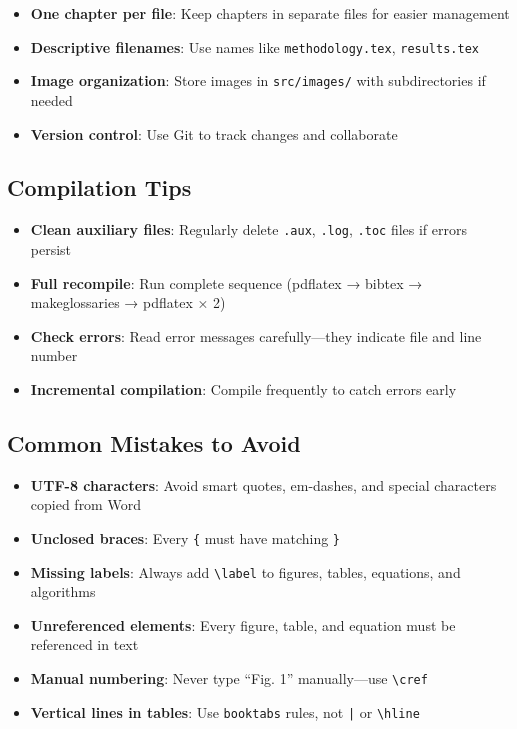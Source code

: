 \begin{itemize}
    \item \textbf{One chapter per file}: Keep chapters in separate files for easier management
    \item \textbf{Descriptive filenames}: Use names like \texttt{methodology.tex}, \texttt{results.tex}
    \item \textbf{Image organization}: Store images in \texttt{src/images/} with subdirectories if needed
    \item \textbf{Version control}: Use Git to track changes and collaborate
\end{itemize}

\subsection*{Compilation Tips}

\begin{itemize}
    \item \textbf{Clean auxiliary files}: Regularly delete \texttt{.aux}, \texttt{.log}, \texttt{.toc} files if errors persist
    \item \textbf{Full recompile}: Run complete sequence (pdflatex → bibtex → makeglossaries → pdflatex × 2)
    \item \textbf{Check errors}: Read error messages carefully---they indicate file and line number
    \item \textbf{Incremental compilation}: Compile frequently to catch errors early
\end{itemize}

\subsection*{Common Mistakes to Avoid}

\begin{itemize}
    \item \textbf{UTF-8 characters}: Avoid smart quotes, em-dashes, and special characters copied from Word
    \item \textbf{Unclosed braces}: Every \texttt{\{} must have matching \texttt{\}}
    \item \textbf{Missing labels}: Always add \texttt{\textbackslash label} to figures, tables, equations, and algorithms
    \item \textbf{Unreferenced elements}: Every figure, table, and equation must be referenced in text
    \item \textbf{Manual numbering}: Never type ``Fig. 1'' manually---use \texttt{\textbackslash cref}
    \item \textbf{Vertical lines in tables}: Use \texttt{booktabs} rules, not \texttt{|} or \texttt{\textbackslash hline}
\end{itemize}

